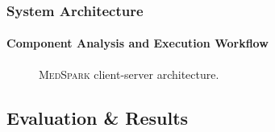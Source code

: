 \documentclass[10pt,    %
    english,            %
    xcolor=table,       %
    envcountsect,        %
    aspectratio=169     %
]{beamer}
\newcommand{\projName}{\textsc{MedSpark}\xspace}
\begin{document}
\begin{frame}
    \frametitle{System Architecture}
    \framesubtitle{Component Analysis and Execution Workflow}

    \begin{figure}[H]
        \centering
        \resizebox{0.9\linewidth}{!}{}
        \caption{\projName client-server architecture.}
        \label{fig:system-architecture}
    \end{figure}

\end{frame}

\subsection{Evaluation \& Results}
\end{document}
